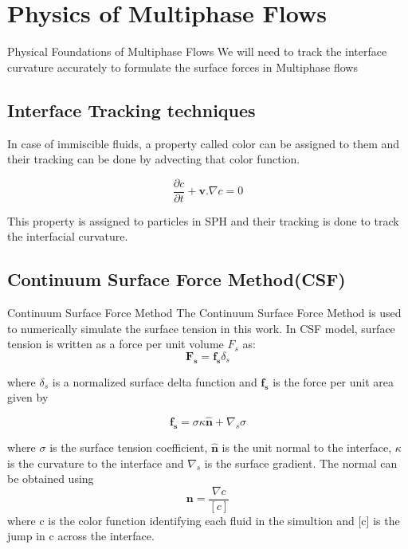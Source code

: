 \documentclass{beamer}
\begin{document}
\section{Physics of Multiphase Flows}
\begin{frame}{Physical Foundations of Multiphase Flows}
We will need to track the interface curvature accurately to formulate the surface forces in Multiphase flows
\subsection{Interface Tracking techniques}
In case of immiscible fluids, a property called color can be assigned to them and their tracking can be done by advecting that color function.

\begin{equation*}
\frac{\partial c}{\partial t} + \mathbf{v}.\nabla c = 0 
\end{equation*}

This property is assigned to particles in SPH and their tracking is done to track the interfacial curvature.
\end{frame}

\subsection{Continuum Surface Force Method(CSF)}
\begin{frame}{Continuum Surface Force Method}
\justifying
The Continuum Surface Force Method is used to numerically simulate the surface tension in this work. In CSF model, surface tension is written as a force per unit volume $F_s$
as:
\begin{equation*}
 \mathbf{F_s} = \mathbf{f_s} \delta_s
\end{equation*}

\noindent
where $\delta_s$ is a normalized surface delta function and $\mathbf{f_s}$ is the force per unit area given by

\begin{equation*}
 \mathbf{f_s} = \sigma \kappa \mathbf{\hat{n}} + \nabla_s \sigma
 \label{forceperarea}
\end{equation*}

\noindent
where $\sigma$ is the surface tension coefficient, $\mathbf{\hat{n}}$ is the unit normal to the interface, $\kappa$ is the curvature to the interface 
and $\nabla_s$ is the surface gradient. The normal can be obtained using
\begin{equation*}
 \mathbf{n} = \frac{\nabla c}{[c]}
\end{equation*}
\noindent
where c is the color function identifying each fluid in the simultion and [c] is the jump in c across the interface. 
\end{frame}
\end{document}
